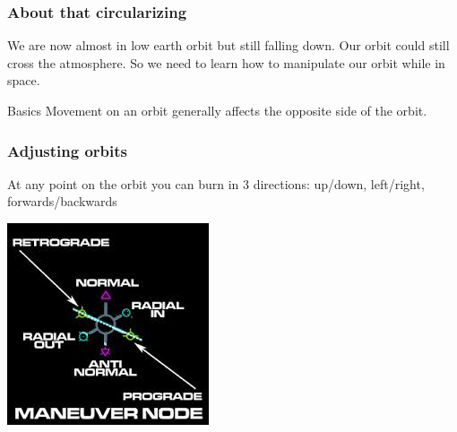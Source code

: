 {
%
\begin{frame}
\end{frame}
\begin{frame}
    \frametitle{About that circularizing}
    \begin{block}{}
        We are now almost in low earth orbit but still falling down. Our orbit could still cross the atmosphere.
        So we need to learn how to manipulate our orbit while in space.
    \end{block}
    \begin{block}{Basics}
        Movement on an orbit generally affects the opposite side of the orbit.
    \end{block}
\end{frame}
\begin{frame}
    \frametitle{Adjusting orbits}
    \begin{block}{}
        \begin{center}
            At any point on the orbit you can burn in 3 directions: up/down, left/right, forwards/backwards
        \end{center}
    \end{block}
    \begin{block}{}
        \begin{center}
            \includegraphics[scale=0.8]{images/maneuver_node.jpg}
        \end{center}
    \end{block}
\end{frame}
}

